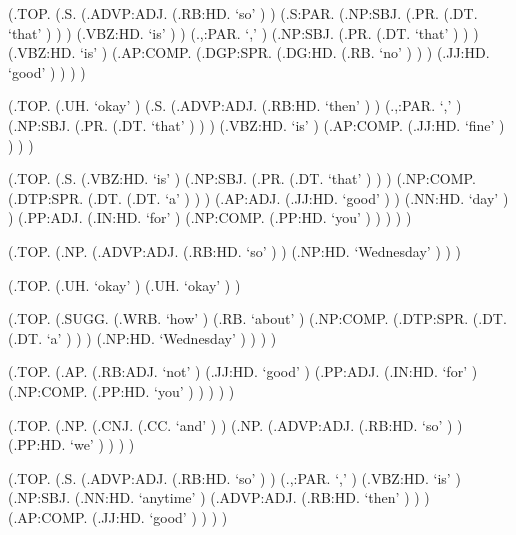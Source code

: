 \documentclass[10pt]{article}
\begin{document}
\begin{parsetree}  (.TOP. (.S. (.ADVP:ADJ. (.RB:HD. `so' ) ) (.S:PAR. (.NP:SBJ. (.PR. (.DT. `that' ) ) ) (.VBZ:HD. `is' ) ) (.,:PAR. `,' ) (.NP:SBJ. (.PR. (.DT. `that' ) ) ) (.VBZ:HD. `is' ) (.AP:COMP. (.DGP:SPR. (.DG:HD. (.RB. `no' ) ) ) (.JJ:HD. `good' ) ) ) ) \end{parsetree}

\begin{parsetree}  (.TOP. (.UH. `okay' ) (.S. (.ADVP:ADJ. (.RB:HD. `then' ) ) (.,:PAR. `,' ) (.NP:SBJ. (.PR. (.DT. `that' ) ) ) (.VBZ:HD. `is' ) (.AP:COMP. (.JJ:HD. `fine' ) ) ) ) \end{parsetree}

\begin{parsetree}  (.TOP. (.S. (.VBZ:HD. `is' ) (.NP:SBJ. (.PR. (.DT. `that' ) ) ) (.NP:COMP. (.DTP:SPR. (.DT. (.DT. `a' ) ) ) (.AP:ADJ. (.JJ:HD. `good' ) ) (.NN:HD. `day' ) ) (.PP:ADJ. (.IN:HD. `for' ) (.NP:COMP. (.PP:HD. `you' ) ) ) ) ) \end{parsetree}

\begin{parsetree}  (.TOP. (.NP. (.ADVP:ADJ. (.RB:HD. `so' ) ) (.NP:HD. `Wednesday' ) ) ) \end{parsetree}

\begin{parsetree}  (.TOP. (.UH. `okay' ) (.UH. `okay' ) ) \end{parsetree}

\begin{parsetree}  (.TOP. (.SUGG. (.WRB. `how' ) (.RB. `about' ) (.NP:COMP. (.DTP:SPR. (.DT. (.DT. `a' ) ) ) (.NP:HD. `Wednesday' ) ) ) ) \end{parsetree}

\begin{parsetree}  (.TOP. (.AP. (.RB:ADJ. `not' ) (.JJ:HD. `good' ) (.PP:ADJ. (.IN:HD. `for' ) (.NP:COMP. (.PP:HD. `you' ) ) ) ) ) \end{parsetree}

\begin{parsetree}  (.TOP. (.NP. (.CNJ. (.CC. `and' ) ) (.NP. (.ADVP:ADJ. (.RB:HD. `so' ) ) (.PP:HD. `we' ) ) ) ) \end{parsetree}

\begin{parsetree}  (.TOP. (.S. (.ADVP:ADJ. (.RB:HD. `so' ) ) (.,:PAR. `,' ) (.VBZ:HD. `is' ) (.NP:SBJ. (.NN:HD. `anytime' ) (.ADVP:ADJ. (.RB:HD. `then' ) ) ) (.AP:COMP. (.JJ:HD. `good' ) ) ) ) \end{parsetree}
\end{document}
